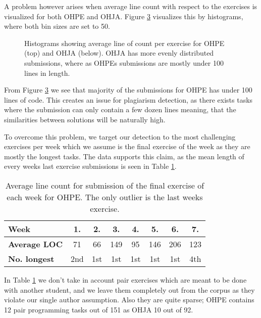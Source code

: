 A problem however arises when average line count with respect to the exercises is visualized for both OHPE and OHJA. Figure \ref{fig-hists} visualizes this by histograms, where both bin sizes are set to 50. 


\begin{figure}[!h]
\centering
\captionsetup[subfigure]{justification=centering}

\begin{subfigure}{\textwidth}
    \setlength\figureheight{4cm}
    \setlength\figurewidth{\textwidth}
    
    \label{fig-ohpeavgloc}
\end{subfigure}

\begin{subfigure}{\textwidth}
  \setlength\figureheight{4cm}
    \setlength\figurewidth{\textwidth}
    
    \label{fig-ohjaavgloc}
\end{subfigure}

\caption[Two histograms for corpora]{Histograms showing average line of count per exercise for OHPE (top) and OHJA (below). OHJA has more evenly distributed submissions, where as OHPEs submissions are mostly under 100 lines in length.}
\label{fig-hists}
\end{figure}

\noindent
From Figure \ref{fig-hists} we see that majority of the submissions for OHPE has under 100 lines of code. This creates an issue for plagiarism detection, as there exists tasks where the submission can only contain a few dozen lines meaning, that the similarities between solutions will be naturally high. 

To overcome this problem, we target our detection to the most challenging exercises per week which we assume is the final exercise of the week as they are mostly the longest tasks. The data supports this claim, as the mean length of every weeks last exercise submissions is seen in Table \ref{tbl-OHPE-last-week}.

\begin{table}[ht]
\centering
\caption{Average line count for submission of the final exercise of each week for OHPE. The only outlier is the last weeks exercise.}
\label{tbl-OHPE-last-week}
\begin{tabular}{l|c|c|c|c|c|c|c}
\bf Week        & 1.  & 2.  & 3.   & 4.  & 5.   & 6.   & 7.   \\ \hline
\bf Average LOC & 71 & 66 & 149 & 95 & 146 & 206 & 123 \\ \hline
\bf No. longest & 2nd  & 1st & 1st  & 1st & 1st   & 1st   & 4th  
\end{tabular}
\end{table}

\noindent
In Table \ref{tbl-OHPE-last-week} we don't take in account pair exercises which are meant to be done with another student, and we leave them completely out from the corpus as they violate our single author assumption. Also they are quite sparse; OHPE contains 12 pair programming tasks out of 151 as OHJA 10 out of 92. 

